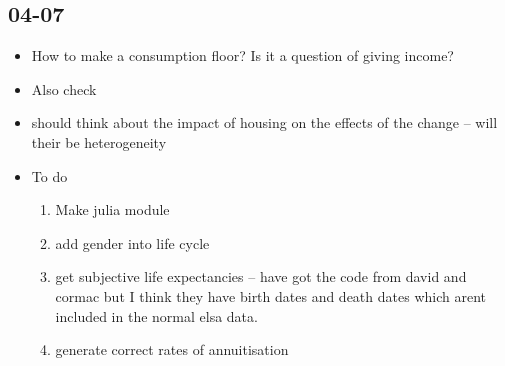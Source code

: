 \documentclass[12pt]{article}
\begin{document}
\subsection{\textbf{04-07}}
\begin{itemize}
    \item How to make a consumption floor? Is it a question of giving income?
    \item Also check
    \item should think about the impact of housing on the effects of the change
          -- will their be heterogeneity

    \item To do
          \begin{enumerate}
              \item Make julia module
              \item add gender into life cycle
              \item get subjective life expectancies -- have got the code from
                    david and cormac but I think they have birth dates and death dates which
                    arent included in the normal elsa data.
              \item generate correct rates of annuitisation
          \end{enumerate}
\end{itemize}
\end{document}
